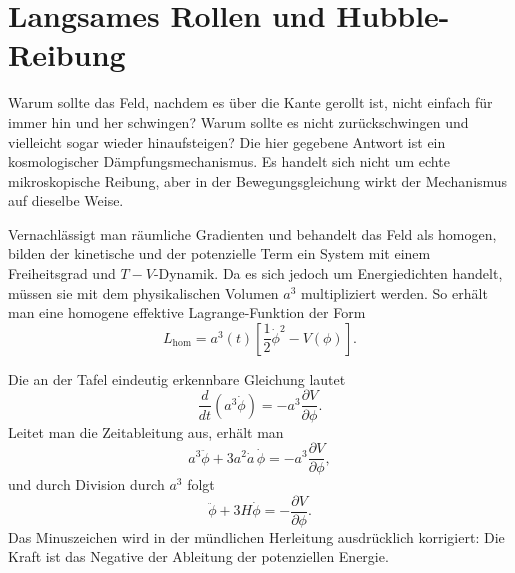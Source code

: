 \begin{classroomqa}
\end{classroomqa}

\section{Langsames Rollen und Hubble-Reibung}

Warum sollte das Feld, nachdem es über die Kante gerollt ist, nicht einfach für immer hin und her schwingen? Warum sollte es nicht zurückschwingen und vielleicht sogar wieder hinaufsteigen? Die hier gegebene Antwort ist ein kosmologischer Dämpfungsmechanismus. Es handelt sich nicht um echte mikroskopische Reibung, aber in der Bewegungsgleichung wirkt der Mechanismus auf dieselbe Weise.

Vernachlässigt man räumliche Gradienten und behandelt das Feld als homogen, bilden der kinetische und der potenzielle Term ein System mit einem Freiheitsgrad und \(T-V\)-Dynamik. Da es sich jedoch um Energiedichten handelt, müssen sie mit dem physikalischen Volumen \(a^3\) multipliziert werden. So erhält man eine homogene effektive Lagrange-Funktion der Form
\begin{equation}
L_{\mathrm{hom}}=a^3(t)\left[\frac12\dot\phi^2-V(\phi)\right].
\end{equation}

Die an der Tafel eindeutig erkennbare Gleichung lautet
\begin{equation}
\frac{d}{dt}\left(a^3\dot\phi\right)=-a^3\frac{\partial V}{\partial\phi}.
\end{equation}
Leitet man die Zeitableitung aus, erhält man
\begin{equation}
a^3\ddot\phi+3a^2\dot a\,\dot\phi=-a^3\frac{\partial V}{\partial\phi},
\end{equation}
und durch Division durch \(a^3\) folgt
\begin{equation}
\ddot\phi+3H\dot\phi=-\frac{\partial V}{\partial\phi}.
\end{equation}
Das Minuszeichen wird in der mündlichen Herleitung ausdrücklich korrigiert: Die Kraft ist das Negative der Ableitung der potenziellen Energie.

